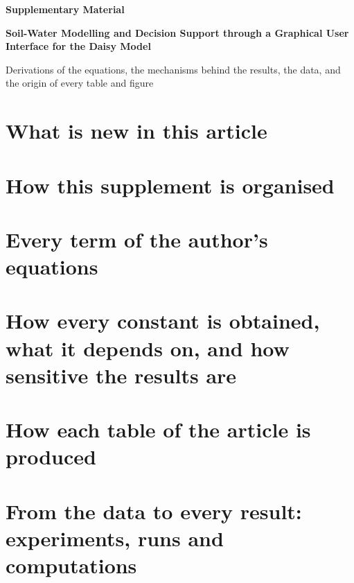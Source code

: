 
\renewcommand{\thesection}{S\arabic{section}}
\renewcommand{\theequation}{S\arabic{equation}}
\renewcommand{\thetable}{S\arabic{table}}
\renewcommand{\thefigure}{S\arabic{figure}}


\begin{center}{\large\bfseries Supplementary Material\par}\vspace{4pt}
{\Large\bfseries Soil-Water Modelling and Decision Support through a Graphical User Interface for the Daisy Model\par}\vspace{6pt}
{\normalsize Derivations of the equations, the mechanisms behind the results, the data, and the origin of every table and figure\par}\end{center}
\authorblock
\tableofcontents
\clearpage
\section{What is new in this article}


\section{How this supplement is organised}




\section{Every term of the author's equations}


\section{How every constant is obtained, what it depends on, and how sensitive the results are}


\section{How each table of the article is produced}


\section{From the data to every result: experiments, runs and computations}\label{sec:prov}


